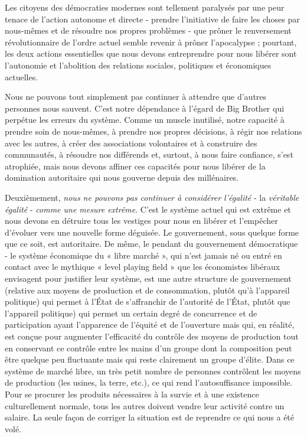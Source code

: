 Les citoyens des démocraties modernes sont tellement paralysés par une peur tenace de l'action autonome et directe - prendre l'initiative de faire les choses par nous-mêmes et de résoudre nos propres problèmes - que prôner le renversement révolutionnaire de l'ordre actuel semble revenir à prôner l'apocalypse ; pourtant, les deux actions essentielles que nous devons entreprendre pour nous libérer sont l'autonomie et l'abolition des relations sociales, politiques et économiques actuelles.

Nous ne pouvons tout simplement pas continuer à attendre que d'autres personnes nous sauvent. C'est notre dépendance à l'égard de Big Brother qui perpétue les erreurs du système. Comme un muscle inutilisé, notre capacité à prendre soin de nous-mêmes, à prendre nos propres décisions, à régir nos relations avec les autres, à créer des associations volontaires et à construire des communautés, à résoudre nos différends et, surtout, à nous faire confiance, s'est atrophiée, mais nous devons affiner ces capacités pour nous libérer de la domination autoritaire qui nous gouverne depuis des millénaires.

Deuxièmement, \emph{nous ne pouvons pas continuer à considérer l'égalité} - la \emph{véritable égalité} - \emph{comme une mesure extrême}. C'est le système actuel qui est extrême et nous devons en détruire tous les vestiges pour nous en libérer et l'empêcher d'évoluer vers une nouvelle forme déguisée. Le gouvernement, sous quelque forme que ce soit, est autoritaire. De même, le pendant du gouvernement démocratique - le système économique du « libre marché », qui n'est jamais né ou entré en contact avec le mythique « level playing field » que les économistes libéraux envisagent pour justifier leur système, est une autre structure de gouvernement (relative aux moyens de production et de consommation, plutôt qu'à l'appareil politique) qui permet à l'État de s'affranchir de l'autorité de l'État, plutôt que l'appareil politique) qui permet un certain degré de concurrence et de participation ayant l'apparence de l'équité et de l'ouverture mais qui, en réalité, est conçue pour augmenter l'efficacité du contrôle des moyens de production tout en conservant ce contrôle entre les mains d'un groupe dont la composition peut être quelque peu fluctuante mais qui reste clairement un groupe d'élite. Dans ce système de marché libre, un très petit nombre de personnes contrôlent les moyens de production (les usines, la terre, etc.), ce qui rend l'autosuffisance impossible. Pour se procurer les produits nécessaires à la survie et à une existence culturellement normale, tous les autres doivent vendre leur activité contre un salaire. La seule façon de corriger la situation est de reprendre ce qui nous a été volé.

